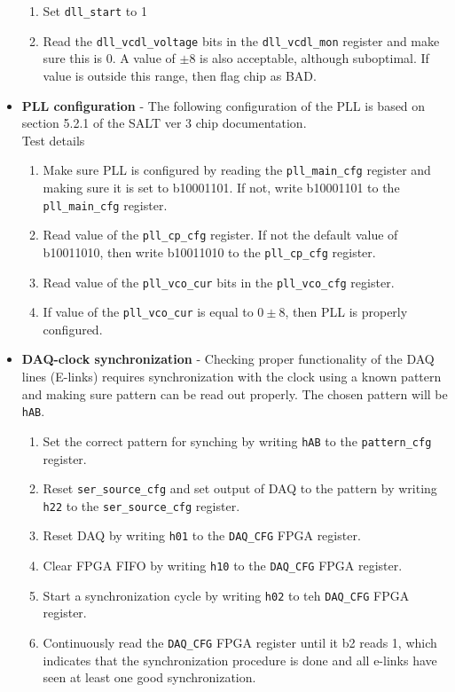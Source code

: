 \documentclass{lhcbnote}
\begin{document}
\begin{itemize}
\begin{enumerate}
\item Set \texttt{dll\_start} to 1
\item Read the \texttt{dll\_vcdl\_voltage} bits in the \texttt{dll\_vcdl\_mon} register and make sure this is 0. A value of $\pm 8$ is also acceptable, although suboptimal. If value is outside this range, then flag chip as BAD.
\end{enumerate}
\item \textbf{PLL configuration} - The following configuration of the PLL is based on section 5.2.1 of the SALT ver 3 chip documentation. \\
Test details
\begin{enumerate}
\item Make sure PLL is configured by reading the \texttt{pll\_main\_cfg} register and making sure it is set to  b10001101. If not, write b10001101 to the \texttt{pll\_main\_cfg} register.
\item Read value of the \texttt{pll\_cp\_cfg} register. If not the default value of b10011010, then write b10011010 to the \texttt{pll\_cp\_cfg} register.
\item Read value of the \texttt{pll\_vco\_cur} bits in the \texttt{pll\_vco\_cfg} register.
\item If value of the \texttt{pll\_vco\_cur} is equal to $0\pm8$, then PLL is properly configured.
\end{enumerate}
\item \textbf{DAQ-clock synchronization} - Checking proper functionality of the DAQ lines (E-links) requires synchronization with the clock using a known pattern and making sure pattern can be read out properly. The chosen pattern will be \texttt{hAB}.
\begin{enumerate}
\item Set the correct pattern for synching by writing \texttt{hAB} to the \texttt{pattern\_cfg} register.
\item Reset \texttt{ser\_source\_cfg} and set output of DAQ to the pattern by writing \texttt{h22} to the \texttt{ser\_source\_cfg} register.
\item Reset DAQ by writing \texttt{h01} to the \texttt{DAQ\_CFG} FPGA register.
\item Clear FPGA FIFO by writing \texttt{h10} to the \texttt{DAQ\_CFG} FPGA register.
\item Start a synchronization cycle by writing \texttt{h02} to teh \texttt{DAQ\_CFG} FPGA register.
\item Continuously read the \texttt{DAQ\_CFG} FPGA register until it b2 reads 1, which indicates that the synchronization procedure is done and all e-links have seen at least one good synchronization. 

\end{enumerate}
\end{itemize}
\end{document}
